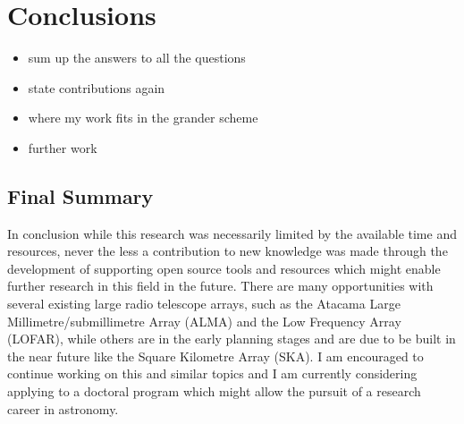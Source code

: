 \newpage
\chapter*{Conclusions}

\begin{itemize}
  \item sum up the answers to all the questions
  \item state contributions again
  \item where my work fits in the grander scheme
  \item further work
\end{itemize}

\section*{Final Summary}

In conclusion while this research was necessarily limited by the available time and resources, never the less a contribution to new knowledge was made through the development of supporting open source tools and resources which might enable further research in this field in the future. There are many opportunities with several existing large radio telescope arrays, such as the Atacama Large Millimetre/submillimetre Array (ALMA) and the Low Frequency Array (LOFAR), while others are in the early planning stages and are due to be built in the near future like the Square Kilometre Array (SKA). I am encouraged to continue working on this and similar topics and I am currently considering applying to a doctoral program which might allow the pursuit of a research career in astronomy.
